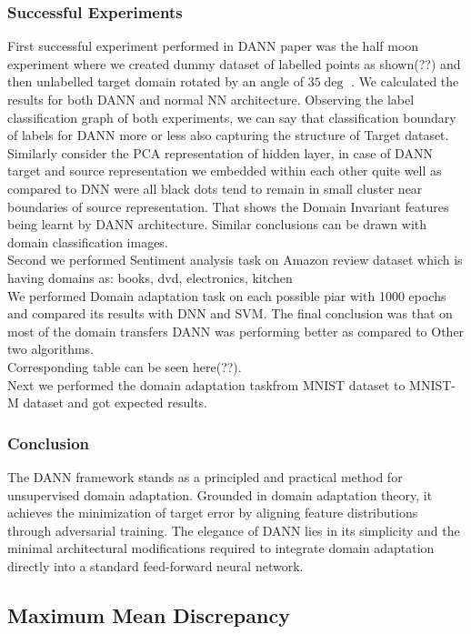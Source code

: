 \documentclass{article}
\begin{document}
\subsubsection{Successful Experiments}
First successful experiment performed in DANN paper was the half moon experiment where we created dummy dataset of labelled points as shown(??) and then unlabelled target domain rotated by an angle of $35\deg$ . We calculated the results for both DANN and normal NN architecture. Observing the label classification graph of both experiments, we can say that classification boundary of labels for DANN more or less also capturing the structure of Target dataset. Similarly consider the PCA representation of hidden layer, in case of DANN target and source representation we embedded within each other quite well as compared to DNN were all black dots tend to remain in small cluster near boundaries of source representation. That shows the Domain Invariant features being learnt by DANN architecture. Similar conclusions can be drawn with domain classification images.
\\
Second we performed Sentiment analysis task on Amazon review dataset which is having domains as:
books, dvd, electronics, kitchen\\
We performed Domain adaptation task on each possible piar with 1000 epochs and compared its results with DNN and SVM. The final conclusion was that on most of the domain transfers DANN was performing better as compared to Other two algorithms.\\
Corresponding table can be seen here(??).
\\ 
Next we performed the domain adaptation taskfrom MNIST dataset to MNIST-M dataset and got expected results.

\subsubsection{Conclusion}

The DANN framework stands as a principled and practical method for unsupervised domain adaptation. Grounded in domain adaptation theory, it achieves the minimization of target error by aligning feature distributions through adversarial training. The elegance of DANN lies in its simplicity and the minimal architectural modifications required to integrate domain adaptation directly into a standard feed-forward neural network.


\subsection*{Maximum Mean Discrepancy}
\end{document}
